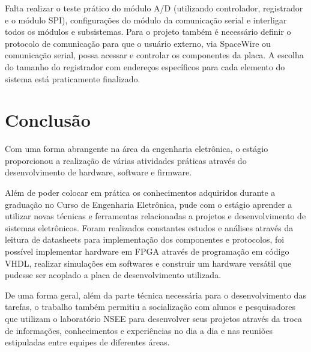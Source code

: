 \documentclass[
	12pt,				%
	openright,			%
	twoside,			%
	a4paper,			%
	english,			%
	french,				%
	spanish,			%
	brazil				%
	]{abntex2}
\begin{document}
Falta realizar o teste prático do módulo A/D (utilizando controlador, registrador e o módulo SPI), configurações do módulo da comunicação serial e interligar todos os módulos e subsistemas. Para o projeto também é necessário definir o protocolo de comunicação para que o usuário externo, via SpaceWire ou comunicação serial, possa acessar e controlar os componentes da placa. A escolha do tamanho do registrador com endereços específicos para cada elemento do sistema está praticamente finalizado.


\chapter{Conclusão}

Com uma forma abrangente na área da  engenharia eletrônica, o estágio proporcionou a realização de várias atividades práticas através do desenvolvimento de hardware, software e firmware.

Além de poder colocar em prática os conhecimentos adquiridos durante a graduação no Curso de Engenharia Eletrônica, pude com o estágio aprender a utilizar novas técnicas e ferramentas relacionadas a projetos e desenvolvimento de sistemas eletrônicos. Foram realizados constantes estudos e análises através da leitura de datasheets para implementação dos componentes e protocolos, foi possível implementar hardware em FPGA através de programação em código VHDL, realizar simulações em softwares e construir um hardware versátil que pudesse ser acoplado a placa de desenvolvimento utilizada.

De uma forma geral, além da parte técnica necessária para o desenvolvimento das tarefas, o trabalho também permitiu a socialização com alunos e pesquisadores que utilizam o laboratório NSEE para desenvolver seus projetos através da troca de informações, conhecimentos e experiências no dia a dia e nas reuniões estipuladas entre equipes de diferentes áreas.




\postextual
\end{document}
